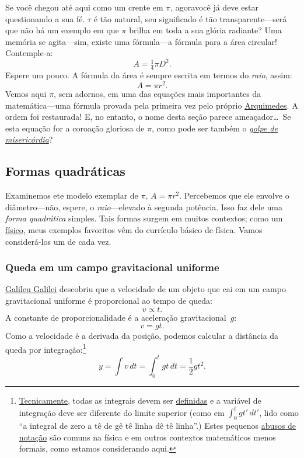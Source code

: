Se você chegou até aqui como um crente em $\pi$,  agoravocê já deve estar questionando a sua fé. $\tau$ é tão natural, seu significado é tão transparente---será que não há um exemplo em que $\pi$ brilha em toda a sua glória radiante? Uma memória se agita---sim, existe uma fórmula---a fórmula para a área circular! Contemple-a:
\[ A = \tfrac{1}{4} \pi D^2. \]
Espere um pouco. A fórmula da área é sempre escrita em termos do \emph{raio}, assim:
\[ A = \pi r^2. \]
Vemos aqui $\pi$, sem adornos, em uma das equações mais importantes da matemática---uma fórmula provada pela primeira vez pelo próprio \href{https://pt.wikipedia.org/wiki/Arquimedes}{Arquimedes}. A ordem foi restaurada! E, no entanto, o nome desta seção parece ameaçador\ldots\ Se esta equação for a coroação gloriosa de $\pi$, como pode ser também o \href{https://pt.wikipedia.org/wiki/Golpe_de_miseric%C3%B3rdia}{\emph{golpe de misericórdia}}?

  \subsection{Formas quadráticas} %
  \label{sec:quadratic_forms}

Examinemos ete modelo exemplar de $\pi$, $A = \pi r^2$. Percebemos que ele envolve o diâmetro---não, espere, o \emph{raio}---elevado à segunda potência. Isso faz dele uma \emph{forma quadrática} simples. Tais formas surgem em muitos contextos; como um \href{https://thesis.library.caltech.edu/1940/}{físico}, meus exemplos favoritos vêm do currículo básico de física. Vamos considerá-los um de cada vez.

    \subsubsection{Queda em um campo gravitacional uniforme} %
    \label{sec:falling_in_a_uniform_gravitational_field}

\href{https://pt.wikipedia.org/wiki/Galileu_Galilei}{Galileu Galilei} descobriu que a velocidade de um objeto que cai em um campo gravitacional uniforme é proporcional ao tempo de queda:
\[ v \propto t. \]
A constante de proporcionalidade é a aceleração gravitacional~$g$:
\[ v = g t. \]
Como a velocidade é a derivada da posição, podemos calcular a distância da queda por integração:\footnote{\href{https://xkcd.com/1475/}{Tecnicamente}, todas as integrais devem ser \href{https://mathworld.wolfram.com/DefiniteIntegral.html}{definidas} e a variável de integração deve ser diferente do limite superior (como em $\int_0^t gt'\,dt'$, lido como ``a integral de zero a tê de gê tê linha dê tê linha''.) Estes pequenos \href{https://en.wikipedia.org/wiki/Abuse_of_notation}{abusos de notação} são comuns na física e em outros contextos matemáticos menos formais, como estamos considerando aqui.}
\[ y = \int v\,dt = \int_0^t gt\,dt = \textstyle{\frac{1}{2}} gt^2. \]


